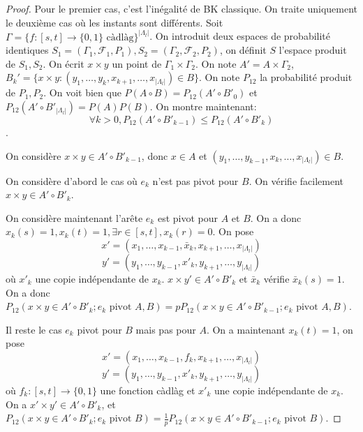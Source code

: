 \documentclass[titlepage,a4paper,11pt]{article}
\begin{document}
\begin{proof}
Pour le premier cas, c'est l'inégalité de BK classique. On traite uniquement le deuxième cas où les instants sont différents. Soit $\Gamma = \{f:[s,t]\rightarrow\{0,1\}\text{ càdlàg} \}^{|\Lambda_l|}$. On introduit deux espaces de probabilité identiques $S_1 = (\Gamma_1,\mathcal{F}_1,P_1), S_2 = (\Gamma_2,\mathcal{F}_2,P_2)$, on définit $S$ l'espace produit de $S_1,S_2$. On écrit $x\times y$ un point de $\Gamma_1 \times \Gamma_2$. On note $A' = A\times \Gamma_2$, $B_k' = \{x\times y :(y_1,\dots,y_k,x_{k+1},\dots,x_{|\Lambda_l|}) \in B\}$. On note $P_{12}$ la probabilité produit de $P_1,P_2$. On voit bien que $P(A\circ B) = P_{12}(A'\circ B'_0)$ et $P_{12}(A'\circ B'_{|\Lambda_l|}) = P(A)P(B)$. On montre maintenant: $$\forall k>0, P_{12}(A'\circ B'_{k-1}) \leqslant P_{12}(A'\circ B'_k)$$. 

On considère $x\times y \in A'\circ B'_{k-1}$, donc $x\in A$ et $(y_1,\dots,y_{k-1},x_k,\dots,x_{|\Lambda_l|})\in B$. 

On considère d'abord le cas où $e_k$ n'est pas pivot pour $B$. On vérifie facilement $x\times y \in A'\circ B'_k$.

On considère maintenant l'arête $e_k$ est pivot pour $A$ et $B$. On a donc $x_k(s) = 1, x_k(t) =1, \exists r\in [s,t], x_k(r) = 0$. On pose $$x'=(x_1,\dots,x_{k-1},\bar{x}_k,x_{k+1},\dots,x_{|\Lambda_l|})$$
$$y'=(y_1,\dots,y_{k-1},x'_k,y_{k+1},\dots,y_{|\Lambda_l|})$$ où $x'_k$ une copie indépendante de $x_k$. $x\times y' \in A'\circ B'_k$ et $\bar{x}_k$ vérifie $\bar{x}_k(s)=1$. On a donc $P_{12}(x\times y \in A'\circ B'_k; e_k \text{ pivot }A,B) = pP_{12}(x\times y \in A'\circ B'_{k-1}; e_k \text{ pivot }A,B)$.

Il reste le cas $e_k$ pivot pour $B$ mais pas pour $A$. On a maintenant $x_k(t) = 1$, on pose 
$$ x'=(x_1,\dots,x_{k-1},f_k,x_{k+1},\dots,x_{|\Lambda_l|})
$$
$$y' =(y_1,\dots,y_{k-1},x'_k,y_{k+1},\dots,y_{|\Lambda_l|})
$$
où $f_k:[s,t]\rightarrow\{0,1\}$ une fonction càdlàg et $x'_k$ une copie indépendante de $x_k$. On a $x'\times y' \in A'\circ B'_k$, et $P_{12}(x\times y \in A'\circ B'_k; e_k \text{ pivot }B) = \frac{1}{p}P_{12}(x\times y \in A'\circ B'_{k-1}; e_k \text{ pivot }B)$.


\end{proof}
\end{document}
